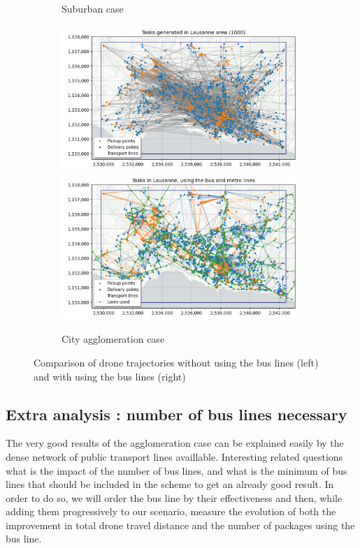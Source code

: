 \begin{figure}
\begin{subfigure}{\linewidth}
        \caption{Suburban case}        
    \end{subfigure}
    \begin{subfigure}{\linewidth}
        \includegraphics[width=0.49\linewidth]{../fig/laus_tasks1000.png}
        \includegraphics[width=0.49\linewidth]{../fig/laus_tasks1000_bus.png}
        \caption{City agglomeration case}        
    \end{subfigure}
    \caption{Comparison of drone trajectories without using the bus lines (left) and with using the bus lines (right)}
    \label{fig:results}
\end{figure}

\subsection{Extra analysis : number of bus lines necessary}

The very good results of the agglomeration case can be explained easily by the dense network of public transport lines availlable. Interesting related questions what is the impact of the number of bus lines, and what is the minimum of bus lines that should be included in the scheme to get an already good result. In order to do so, we will order the bus line by their effectiveness and then, while adding them progressively to our scenario, measure the evolution of both the improvement in total drone travel distance and the number of packages using the bus line.

